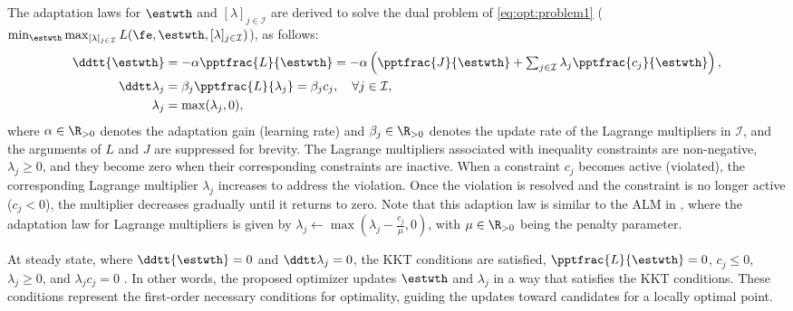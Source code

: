 \documentclass[lettersize,journal]{IEEEtran}
\begin{document}
The adaptation laws for $\estwth$ and $[\lambda]_{j\in\mathcal I}$ are derived to solve the dual problem of \eqref{eq:opt:problem1} (\ie  $\min_{\estwth} \max_{[\lambda]_{j\in\mathcal I}}L(\fe,\estwth,[\lambda]_{j\in\mathcal I})$), as follows:
\begin{subequations}
    \begin{align}
            \ddtt{\estwth}
            &
            =
            -\alpha \pptfrac{L}{\estwth}
            =
            -\alpha 
            \left(
                \pptfrac{J}{\estwth}
                +
                \textstyle\sum_{j\in\mathcal{I}}
                \lambda_j 
                \pptfrac{c_j}{\estwth}
            \right),
        \label{eq:adap:th}
            \\
            \ddtt\lambda_j
            & 
            = 
            \beta_j\pptfrac{L}{\lambda_j} 
            = 
            \beta_j c_j ,
            \quad \forall j\in\mathcal I,
        \label{eq:adap:lbd}
            \\
            \lambda_j & = \max(\lambda_j,0) ,
        \label{eq:adap:lbd:max}
    \end{align}
    \label{eq:adaptation law}
\end{subequations}
where $\alpha\in\R_{>0}$ denotes the adaptation gain (learning rate) and $\beta_j\in\R_{>0}$ denotes the update rate of the Lagrange multipliers in $\mathcal I$, and the arguments of $L$ and $J$ are suppressed for brevity. 
The Lagrange multipliers associated with inequality constraints are non-negative, \ie $\lambda_j\ge 0$, and they become zero when their corresponding constraints are inactive. When a constraint $c_j$ becomes active (\ie violated), the corresponding Lagrange multiplier $\lambda_j$ increases to address the violation. Once the violation is resolved and the constraint is no longer active (\ie $c_j < 0$), the multiplier decreases gradually until it returns to zero. Note that this adaption law is similar to the ALM in \cite{Nocedal:2006aa}, where the adaptation law for Lagrange multipliers is given by $\lambda_j\leftarrow \max\left(\lambda_j-\tfrac{c_j}{\mu},0\right)$, with $\mu\in\R_{>0}$ being the penalty parameter. 

At steady state, where $\ddtt{\estwth}=0$ and $\ddtt\lambda_j=0$, the KKT conditions are satisfied, \ie $\pptfrac{L}{\estwth}=0$, $c_j \le 0$, $\lambda_j \ge 0$, and $\lambda_j c_j=0$ \cite[Chap.~12 T.~12.1]{Nocedal:2006aa}.
In other words, the proposed optimizer updates $\estwth$ and $\lambda_j$ in a way that satisfies the KKT conditions. 
These conditions represent the first-order necessary conditions for optimality, guiding the updates toward candidates for a locally optimal point.
\end{document}
